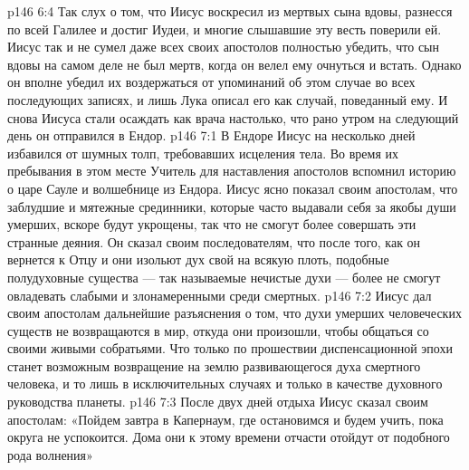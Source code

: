 \vs p146 6:4 Так слух о том, что Иисус воскресил из мертвых сына вдовы, разнесся по всей Галилее и достиг Иудеи, и многие слышавшие эту весть поверили ей. Иисус так и не сумел даже всех своих апостолов полностью убедить, что сын вдовы на самом деле не был мертв, когда он велел ему очнуться и встать. Однако он вполне убедил их воздержаться от упоминаний об этом случае во всех последующих записях, и лишь Лука описал его как случай, поведанный ему. И снова Иисуса стали осаждать как врача настолько, что рано утром на следующий день он отправился в Ендор.
\vs p146 7:1 В Ендоре Иисус на несколько дней избавился от шумных толп, требовавших исцеления тела. Во время их пребывания в этом месте Учитель для наставления апостолов вспомнил историю о царе Сауле и волшебнице из Ендора. Иисус ясно показал своим апостолам, что заблудшие и мятежные срединники, которые часто выдавали себя за якобы души умерших, вскоре будут укрощены, так что не смогут более совершать эти странные деяния. Он сказал своим последователям, что после того, как он вернется к Отцу и они изольют дух свой на всякую плоть, подобные полудуховные существа --- так называемые нечистые духи --- более не смогут овладевать слабыми и злонамеренными среди смертных.
\vs p146 7:2 Иисус дал своим апостолам дальнейшие разъяснения о том, что духи умерших человеческих существ не возвращаются в мир, откуда они произошли, чтобы общаться со своими живыми собратьями. Что только по прошествии диспенсационной эпохи станет возможным возвращение на землю развивающегося духа смертного человека, и то лишь в исключительных случаях и только в качестве духовного руководства планеты.
\vs p146 7:3 После двух дней отдыха Иисус сказал своим апостолам: «Пойдем завтра в Капернаум, где остановимся и будем учить, пока округа не успокоится. Дома они к этому времени отчасти отойдут от подобного рода волнения»

